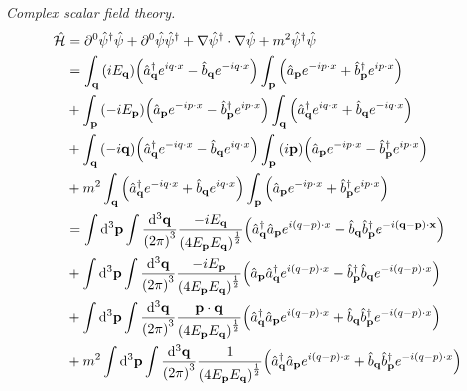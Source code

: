 \documentclass{report}
\begin{document}
\begin{subquests}
	\item \emph{Complex scalar field theory.}
	\begin{align*}
		\hat{\mathcal H} & = \partial^0\hat{\psi}^{\dagger}\hat{\psi} + \partial^0\hat{\psi}\hat{\psi}^{\dagger} + \nabla\hat{\psi}^{\dagger}\cdot\nabla\hat{\psi} + m^2 \hat{\psi}^{\dagger}\hat{\psi} \\
		& = \int_{\mathbf q}\pqty{iE_{\vb q}}\pqty{\hat{a}^{\dagger}_{\vb q}e^{i q \cdot x} - \hat{b}_{\vb q}e^{-i q \cdot x}} \int_{\mathbf p} \pqty{\hat{a}_{\vb p}e^{-i p \cdot x} + \hat{b}^{\dagger}_{\vb p}e^{i p \cdot x}} \\
		& + \int_{\mathbf p} \pqty{-iE_{\vb p}}\pqty{\hat{a}_{\vb p}e^{-i p \cdot x} - \hat{b}^{\dagger}_{\vb p}e^{i p \cdot x}}\int_{\mathbf q}\pqty{\hat{a}^{\dagger}_{\vb q}e^{i q \cdot x} + \hat{b}_{\vb q}e^{-i q \cdot x}}  \\
		& + \int_{\mathbf q}\pqty{-i\vb q}\pqty{\hat{a}^{\dagger}_{\vb q}e^{-i q \cdot x} - \hat{b}_{\vb q}e^{i q \cdot x}} \int_{\mathbf p} \pqty{i\vb p}\pqty{\hat{a}_{\vb p}e^{-i p \cdot x} - \hat{b}^{\dagger}_{\vb p}e^{i p \cdot x}}\\
		& + m^2 \int_{\mathbf q}\pqty{\hat{a}^{\dagger}_{\vb q}e^{-i q \cdot x} + \hat{b}_{\vb q}e^{i q \cdot x}}\int_{\mathbf p} \pqty{\hat{a}_{\vb p}e^{-i p \cdot x} + \hat{b}^{\dagger}_{\vb p}e^{i p \cdot x}} \\
		& = \int\dd^3{\vb p}\int\frac{\dd^3{\vb q}}{\pqty{2\pi}^3}\frac{-iE_{\vb q}}{\pqty{4E_{\vb p}E_{\vb q}}^{\frac{1}{2}}}\pqty{\hat{a}^{\dagger}_{\vb q}\hat{a}_{\vb p}e^{i(q-p)\cdot x} - \hat{b}_{\vb q}\hat{b}^{\dagger}_{\vb p}e^{- i(\vb q -\vb p)\cdot \vb x}} \\
		& + \int\dd^3{\vb p}\int\frac{\dd^3{\vb q}}{\pqty{2\pi}^3}\frac{-iE_{\vb p}}{\pqty{4E_{\vb p}E_{\vb q}}^{\frac{1}{2}}}\pqty{\hat{a}_{\vb p}\hat{a}^{\dagger}_{\vb q}e^{i(q-p)\cdot x} - \hat{b}^{\dagger}_{\vb p}\hat{b}_{\vb q}e^{-i(q-p)\cdot x}} \\
		& + \int\dd^3{\vb p}\int\frac{\dd^3{\vb q}}{\pqty{2\pi}^3}\frac{\vb p \cdot \vb q}{\pqty{4E_{\vb p}E_{\vb q}}^{\frac{1}{2}}}\pqty{\hat{a}^{\dagger}_{\vb q}\hat{a}_{\vb p}e^{i(q-p)\cdot x} + \hat{b}_{\vb q}\hat{b}^{\dagger}_{\vb p}e^{-i(q-p)\cdot x}} \\
		& + m^2 \int\dd^3{\vb p}\int\frac{\dd^3{\vb q}}{\pqty{2\pi}^3}\frac{1}{\pqty{4E_{\vb p}E_{\vb q}}^{\frac{1}{2}}}\pqty{\hat{a}^{\dagger}_{\vb q}\hat{a}_{\vb p}e^{i(q-p)\cdot x} + \hat{b}_{\vb q}\hat{b}^{\dagger}_{\vb p}e^{-i(q-p)\cdot x}}
	\end{align*}


\end{subquests}
\end{document}
